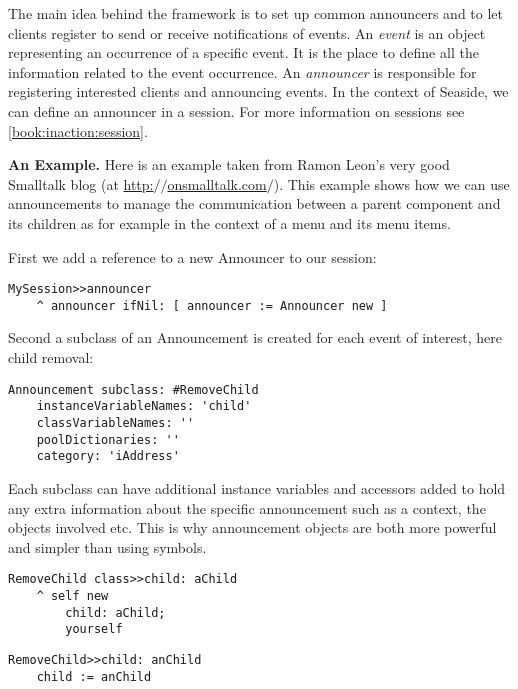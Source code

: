 \documentclass[a4paper,10pt,twoside]{book}
\newcommand{\ct}[1]{{\small\ttfamily\textup{#1}}}
\begin{document}
The main idea behind the framework is to set up common announcers and to let clients register to send or receive notifications of events. An \textit{event} is an object representing an occurrence of a specific event. It is the place to define all the information related to the event occurrence. An \textit{announcer} is responsible for registering interested clients and announcing events. In the context of Seaside, we can define an announcer in a session. For more information on sessions see \autoref{book:inaction:session}.

\textbf{An Example.} Here is an example taken from Ramon Leon's very good Smalltalk blog (at \href{http://onsmalltalk.com/}{http:$/$$/$onsmalltalk.com$/$}). This example shows how we can use announcements to manage the communication between a parent component and its children as for example in the context of a menu and its menu items.

First we add a reference to a new \ct{Announcer} to our session:

\begin{lstlisting}
MySession>>announcer
    ^ announcer ifNil: [ announcer := Announcer new ]
\end{lstlisting}

Second a subclass of an  \ct{Announcement} is created for each event of interest, here child removal:

\begin{lstlisting}
Announcement subclass: #RemoveChild
    instanceVariableNames: 'child'
    classVariableNames: ''
    poolDictionaries: ''
    category: 'iAddress'
\end{lstlisting}

Each subclass can have additional instance variables and accessors added to hold any extra information about the specific announcement such as a context, the objects involved etc. This is why announcement objects are both more powerful and simpler than using symbols.

\begin{lstlisting}
RemoveChild class>>child: aChild
    ^ self new
        child: aChild;
        yourself
\end{lstlisting}

\begin{lstlisting}
RemoveChild>>child: anChild
    child := anChild
\end{lstlisting}
\end{document}
